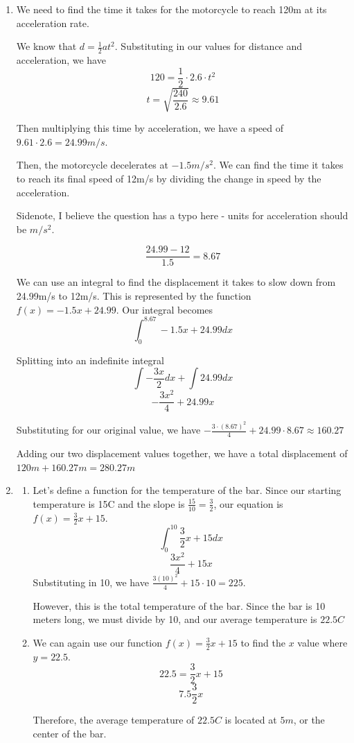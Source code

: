 \documentclass[11pt, letterpaper, twoside]{article}
\begin{document}
\begin{enumerate}
\item %
We need to find the time it takes for the motorcycle to reach 120m at its acceleration rate.

We know that \(d=\frac{1}{2}at^2\). 
Substituting in our values for distance and acceleration, we have 
\[120=\frac{1}{2}\cdot2.6\cdot t^2\]
\[t=\sqrt{\frac{240}{2.6}}\approx9.61\]

Then multiplying this time by acceleration, we have a speed of \(9.61\cdot2.6=24.99m/s\).

Then, the motorcycle decelerates at \(-1.5m/s^2\). 
We can find the time it takes to reach its final speed of 12m/s by dividing the change in speed by the acceleration.

Sidenote, I believe the question has a typo here - units for acceleration should be \(m/s^2\).

\[\frac{24.99-12}{1.5}=8.67\]

We can use an integral to find the displacement it takes to slow down from 24.99m/s to 12m/s. 
This is represented by the function \(f(x)=-1.5x+24.99\).
Our integral becomes 
\[\int_0^{8.67}-1.5x+24.99dx\]

Splitting into an indefinite integral
\[\int-\frac{3x}{2}dx+\int24.99dx\]
\[-\frac{3x^2}{4}+24.99x\]

Substituting for our original value, we have \(-\frac{3\cdot(8.67)^2}{4}+24.99\cdot8.67\approx160.27\)

Adding our two displacement values together, we have a total displacement of \(120m+160.27m=\boxed{280.27m}\)
\item %
\begin{enumerate}[label=\alph*)]
\item Let's define a function for the temperature of the bar.
Since our starting temperature is 15C and the slope is \(\frac{15}{10}=\frac{3}{2}\),
our equation is \(f(x)=\frac{3}{2}x+15\).
\[\int_0^{10} \frac{3}{2}x+15dx\]
\[\frac{3x^2}{4}+15x\]
Substituting in 10, we have \(\frac{3(10)^2}{4}+15\cdot10=225\).

However, this is the total temperature of the bar. Since the bar is 10 meters long, we must divide by 10,
and our average temperature is \(\boxed{22.5C}\)

\item We can again use our function \(f(x)=\frac{3}{2}x+15\) to find the \(x\) value where \(y=22.5\).
\[22.5=\frac{3}{2}x+15\]
\[7.5\frac{3}{2}x\]

Therefore, the average temperature of \(22.5C\) is located at \(5m\), or the center of the bar.
\end{enumerate}
\end{enumerate}
\end{document}
